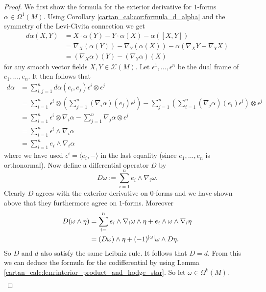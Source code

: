 \begin{proof}
    We first show the formula for the exterior derivative for $1$-forms $\alpha \in \Omega^1(M)$. Using Corollary \ref{cartan_cal:cor:formula_d_alpha} and the symmetry of the Levi-Civita connection we get
    \begin{align*}
        d\alpha(X,Y) &= X \cdot \alpha(Y) - Y \cdot \alpha(X) - \alpha([X,Y]) \\
        &= \nabla_X(\alpha(Y)) - \nabla_Y(\alpha(X)) - \alpha(\nabla_XY - \nabla_YX) \\
        &= (\nabla_X\alpha)(Y) - (\nabla_Y\alpha)(X)
    \end{align*}
    for any smooth vector fields $X,Y \in \mathscr{X}(M)$. Let $\epsilon^1,\ldots,\epsilon^n$ be the dual frame of $e_1,\ldots,e_n$. It then follows that 
    \begin{align*}
        d\alpha &= \sum_{i,j=1}^n d\alpha(e_i,e_j) \epsilon^i \otimes \epsilon^j \\ 
        &= \sum_{i=1}^{n} \epsilon^i \otimes \left(\sum_{j=1}^{n} (\nabla_i\alpha)(e_j)\epsilon^j\right) - \sum_{j=1}^{n} \left(\sum_{i=1}^{n} (\nabla_j\alpha)(e_i)\epsilon^i\right) \otimes \epsilon^j \\
        &= \sum_{i=1}^{n} \epsilon^i \otimes \nabla_i\alpha - \sum_{j=1}^{n} \nabla_j\alpha \otimes \epsilon^j \\ 
        &= \sum_{i=1}^n \epsilon^i \wedge \nabla_i\alpha \\
        &=  \sum_{i=1}^n e_i \wedge \nabla_i\alpha
    \end{align*}
    where we have used $\epsilon^i = \langle e_i,- \rangle$ in the last equality (since $e_1,\ldots,e_n$ is orthonormal). Now define a differential operator $D$ by 
    \[
    D\omega := \sum_{i=1}^n e_i \wedge \nabla_i\omega.
    \]
    Clearly $D$ agrees with the exterior derivative on $0$-forms and we have shown above that they furthermore agree on $1$-forms. Moreover
    \begin{align*}
        D(\omega\wedge\eta) &= \sum_{i=}^{n} e_i \wedge \nabla_i\omega \wedge \eta + e_i \wedge \omega \wedge\nabla_i\eta \\
        &= (D\omega)\wedge\eta + (-1)^{\lvert\omega\rvert}\omega \wedge D\eta.
    \end{align*}
    So $D$ and $d$ also satisfy the same Leibniz rule. It follows that $D=d$. From this we can deduce the formula for the codifferential by using Lemma \ref{cartan_calc:lem:interior_product_and_hodge_star}. So let $\omega \in \Omega^k(M)$.
    \begin{align*}

\end{align*}
\end{proof}
